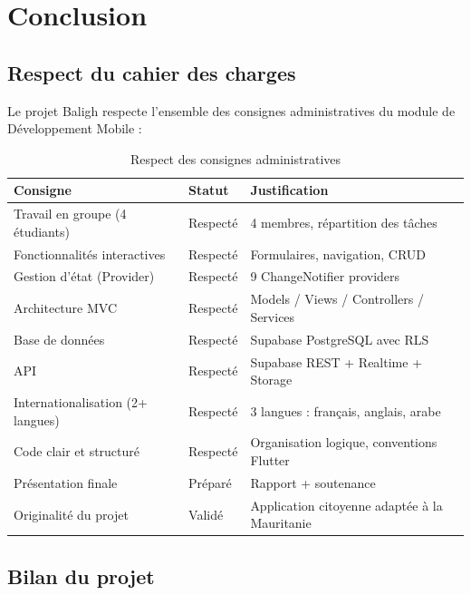 \documentclass[12pt,a4paper]{report}
\newcommand{\done}{\textcolor{okgreen}{\checkmark}}
\begin{document}
\chapter{Conclusion}

\section{Respect du cahier des charges}

Le projet Baligh respecte l'ensemble des consignes administratives du module de Développement Mobile :

{\small
\begin{longtable}{|p{4.5cm}|p{2.5cm}|p{6.5cm}|}
    \caption{Respect des consignes administratives}
    \label{tab:consignes}\\
    \hline
    \rowcolor{supnumgreen!20}
    \textbf{Consigne} & \textbf{Statut} & \textbf{Justification} \\
    \hline
    \endhead
    \hline
    \endfoot
    Travail en groupe (4 étudiants) & \done{}  Respecté & 4 membres, répartition des tâches \\
    \hline
    Fonctionnalités interactives & \done{}  Respecté & Formulaires, navigation, CRUD \\
    \hline
    Gestion d'état (Provider) & \done{}  Respecté & 9 ChangeNotifier providers \\
    \hline
    Architecture MVC & \done{}  Respecté & Models / Views / Controllers / Services \\
    \hline
    Base de données & \done{}  Respecté & Supabase PostgreSQL avec RLS \\
    \hline
    API & \done{}  Respecté & Supabase REST + Realtime + Storage \\
    \hline
    Internationalisation (2+ langues) & \done{}  Respecté & 3 langues : français, anglais, arabe \\
    \hline
    Code clair et structuré & \done{}  Respecté & Organisation logique, conventions Flutter \\
    \hline
    Présentation finale & \done{}  Préparé & Rapport + soutenance \\
    \hline
    Originalité du projet & \done{}  Validé & Application citoyenne adaptée à la Mauritanie \\
    \hline
\end{longtable}
}

\section{Bilan du projet}
\end{document}
